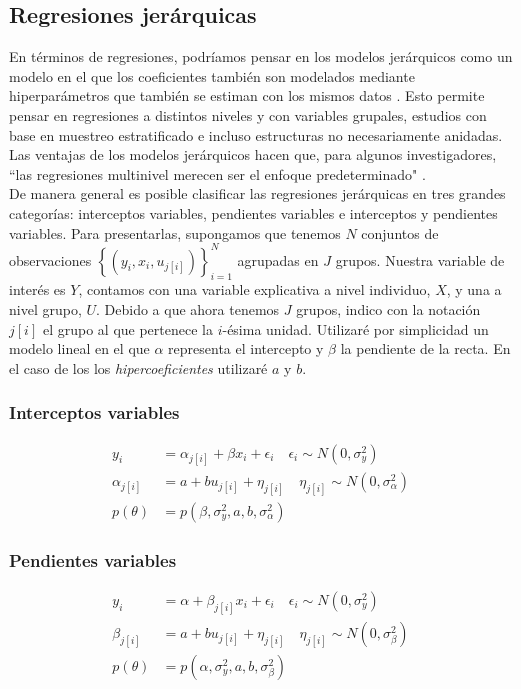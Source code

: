 \subsection{Regresiones jerárquicas}

En términos de regresiones, podríamos pensar en los modelos jerárquicos como un modelo en el que los coeficientes también son modelados mediante hiperparámetros que también se estiman con los mismos datos \parencite[1]{GelmanHill06}. Esto permite pensar en regresiones a distintos niveles y con variables grupales, estudios con base en muestreo estratificado e incluso estructuras no necesariamente anidadas. Las ventajas de los modelos jerárquicos hacen que, para algunos investigadores, ``las regresiones multinivel merecen ser el enfoque predeterminado" \parencite[356, traducción propia]{McElreath15}.\\

De manera general es posible clasificar las regresiones jerárquicas en tres grandes categorías: interceptos variables, pendientes variables e interceptos y pendientes variables. Para presentarlas, supongamos que tenemos $N$ conjuntos de observaciones $\left\lbrace(y_i,x_i,u_{j[i]})\right\rbrace_{i=1}^{N}$ agrupadas en $J$ grupos. Nuestra variable de interés es $Y$, contamos con una variable explicativa a nivel individuo, $X$,  y una a nivel grupo,  $U$.  Debido a que ahora tenemos $J$ grupos, indico con la notación $j[i]$ el grupo al que pertenece la $i$-ésima unidad. Utilizaré  por simplicidad un modelo lineal en el que $\alpha$ representa el intercepto y $\beta$ la pendiente de la recta. En el caso de los los \textit{hipercoeficientes} utilizaré $a$ y $b$. 

\subsubsection*{Interceptos variables}
\begin{align*}
y_i &= \alpha_{j[i]} + \beta x_i + \epsilon_i  \quad \epsilon_i  \sim N(0,\sigma_y^2) \\
\alpha_{j[i]} &= a + b u_{j[i]} + \eta_{j[i]} \quad \eta_{j[i]} \sim N(0, \sigma_{\alpha}^2) \\ 
p(\theta) &= p(\beta,\sigma_y^2,a,b,\sigma_{\alpha}^2)
\end{align*}

\subsubsection*{Pendientes variables}
\begin{align*}
y_i &= \alpha + \beta_{j[i]} x_i + \epsilon_i  \quad \epsilon_i  \sim N(0,\sigma_y^2) \\
\beta_{j[i]} &= a + b u_{j[i]} + \eta_{j[i]} \quad \eta_{j[i]} \sim N(0, \sigma_{\beta}^2) \\ 
p(\theta) &= p(\alpha,\sigma_y^2,a,b,\sigma_{\beta}^2)
\end{align*}


